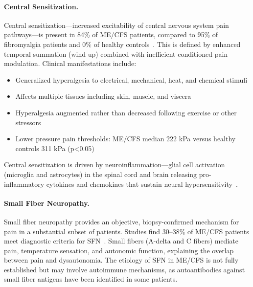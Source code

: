 \paragraph{Central Sensitization.}
Central sensitization---increased excitability of central nervous system pain pathways---is present in 84\% of ME/CFS patients, compared to 95\% of fibromyalgia patients and 0\% of healthy controls~\cite{Nijs2021sensitization}. This is defined by enhanced temporal summation (wind-up) combined with inefficient conditioned pain modulation. Clinical manifestations include:
\begin{itemize}
    \item Generalized hyperalgesia to electrical, mechanical, heat, and chemical stimuli
    \item Affects multiple tissues including skin, muscle, and viscera
    \item Hyperalgesia augmented rather than decreased following exercise or other stressors
    \item Lower pressure pain thresholds: ME/CFS median 222 kPa versus healthy controls 311 kPa (p<0.05)~\cite{Nijs2021sensitization}
\end{itemize}

Central sensitization is driven by neuroinflammation---glial cell activation (microglia and astrocytes) in the spinal cord and brain releasing pro-inflammatory cytokines and chemokines that sustain neural hypersensitivity~\cite{Nijs2017neuroinflammation}.

\paragraph{Small Fiber Neuropathy.}
Small fiber neuropathy provides an objective, biopsy-confirmed mechanism for pain in a substantial subset of patients. Studies find 30--38\% of ME/CFS patients meet diagnostic criteria for SFN~\cite{Oaklander2022SFN}. Small fibers (A-delta and C fibers) mediate pain, temperature sensation, and autonomic function, explaining the overlap between pain and dysautonomia. The etiology of SFN in ME/CFS is not fully established but may involve autoimmune mechanisms, as autoantibodies against small fiber antigens have been identified in some patients.

